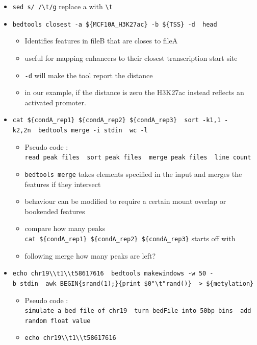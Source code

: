 \documentclass[
]{book}
\providecommand{\tightlist}{%
  \setlength{\itemsep}{0pt}\setlength{\parskip}{0pt}}
\begin{document}
\begin{itemize}
\tightlist
\item
  \texttt{sed\ \textquotesingle{}s/\ /\textbackslash{}t/g\textquotesingle{}} replace a \texttt{} with \texttt{\textbackslash{}t}
\item
  \texttt{bedtools\ closest\ -a\ \$\{MCF10A\_H3K27ac\}\ -b\ \$\{TSS\}\ -d\ \textbar{}\ head}

  \begin{itemize}
  \tightlist
  \item
    Identifies features in fileB that are closes to fileA
  \item
    useful for mapping enhancers to their closest transcription start site
  \item
    \texttt{-d} will make the tool report the distance
  \item
    in our example, if the distance is zero the H3K27ac instead reflects an activated promoter.
  \end{itemize}
\item
  \texttt{cat\ \$\{condA\_rep1\}\ \$\{condA\_rep2\}\ \$\{condA\_rep3\}\ \textbar{}\ sort\ -k1,1\ -k2,2n\ \textbar{}\ bedtools\ merge\ -i\ stdin\ \textbar{}\ wc\ -l}

  \begin{itemize}
  \tightlist
  \item
    Pseudo code : \texttt{read\ peak\ files\ \textbar{}\ sort\ peak\ files\ \textbar{}\ merge\ peak\ files\ \textbar{}\ line\ count}
  \item
    \texttt{bedtools\ merge} takes elements specified in the input and merges the features if they intersect
  \item
    behaviour can be modified to require a certain mount overlap or bookended features
  \item
    compare how many peaks \texttt{cat\ \$\{condA\_rep1\}\ \$\{condA\_rep2\}\ \$\{condA\_rep3\}} starts off with
  \item
    following merge how many peaks are left?
  \end{itemize}
\item
  \texttt{echo\ chr19\textbackslash{}\textbackslash{}t1\textbackslash{}\textbackslash{}t58617616\ \textbar{}\ bedtools\ makewindows\ -w\ 50\ -b\ stdin\ \textbar{}\ awk\ \textquotesingle{}BEGIN\{srand(1);\}\{print\ \$0"\textbackslash{}t"rand()\}\textquotesingle{}\ \ \textgreater{}\ \$\{metylation\}}

  \begin{itemize}
  \tightlist
  \item
    Pseudo code : \texttt{simulate\ a\ bed\ file\ of\ chr19\ \textbar{}\ turn\ bedFile\ into\ 50bp\ bins\ \textbar{}\ add\ random\ float\ value}
  \item
    \texttt{echo\ chr19\textbackslash{}\textbackslash{}t1\textbackslash{}\textbackslash{}t58617616}


\end{itemize}
\end{itemize}
\end{document}
